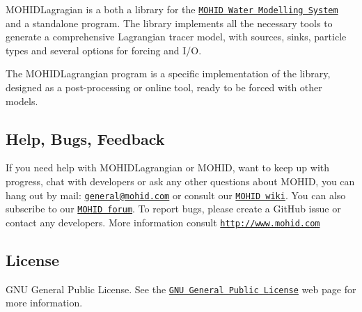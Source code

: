 M\+O\+H\+I\+D\+Lagragian is a both a library for the \href{http://www.mohid.com}{\tt M\+O\+H\+ID Water Modelling System} and a standalone program. The library implements all the necessary tools to generate a comprehensive Lagrangian tracer model, with sources, sinks, particle types and several options for forcing and I/O.

The M\+O\+H\+I\+D\+Lagrangian program is a specific implementation of the library, designed as a post-\/processing or online tool, ready to be forced with other models.

\subsection*{Help, Bugs, Feedback}

If you need help with M\+O\+H\+I\+D\+Lagrangian or M\+O\+H\+ID, want to keep up with progress, chat with developers or ask any other questions about M\+O\+H\+ID, you can hang out by mail\+: \href{mailto:general@mohid.com}{\tt general@mohid.\+com} or consult our \href{http://wiki.mohid.com}{\tt M\+O\+H\+ID wiki}. You can also subscribe to our \href{http://forum.mohid.com}{\tt M\+O\+H\+ID forum}. To report bugs, please create a Git\+Hub issue or contact any developers. More information consult \href{http://www.mohid.com}{\tt http\+://www.\+mohid.\+com}

\subsection*{License}

G\+NU General Public License. See the \href{http://www.gnu.org/copyleft/gpl.html}{\tt G\+NU General Public License} web page for more information. 